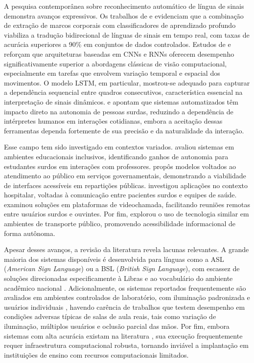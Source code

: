A pesquisa contemporânea sobre reconhecimento automático de língua de sinais demonstra avanços expressivos. Os trabalhos de \cite{attili:24} e \cite{jain:24} evidenciam que a combinação de extração de marcos corporais com classificadores de aprendizado profundo viabiliza a tradução bidirecional de línguas de sinais em tempo real, com taxas de acurácia superiores a 90\% em conjuntos de dados controlados. Estudos de \cite{abdulhussein:20} e \cite{li:22} reforçam que arquiteturas baseadas em CNNs e RNNs oferecem desempenho significativamente superior a abordagens clássicas de visão computacional, especialmente em tarefas que envolvem variação temporal e espacial dos movimentos. O modelo LSTM, em particular, mostrou-se adequado para capturar a dependência sequencial entre quadros consecutivos, característica essencial na interpretação de sinais dinâmicos. \cite{wang:24} e \cite{dockens:18} apontam que sistemas automatizados têm impacto direto na autonomia de pessoas surdas, reduzindo a dependência de intérpretes humanos em interações cotidianas, embora a aceitação dessas ferramentas dependa fortemente de sua precisão e da naturalidade da interação.

Esse campo tem sido investigado em contextos variados. \cite{attili:24} avaliou sistemas em ambientes educacionais inclusivos, identificando ganhos de autonomia para estudantes surdos em interações com professores. \cite{jain:24} propôs modelos voltados ao atendimento ao público em serviços governamentais, demonstrando a viabilidade de interfaces acessíveis em repartições públicas. \cite{abdulhussein:20} investigou aplicações no contexto hospitalar, voltadas à comunicação entre pacientes surdos e equipes de saúde. \cite{li:22} examinou soluções em plataformas de videochamada, facilitando reuniões remotas entre usuários surdos e ouvintes. Por fim, \cite{wang:24} explorou o uso de tecnologia similar em ambientes de transporte público, promovendo acessibilidade informacional de forma autônoma.

Apesar desses avanços, a revisão da literatura revela lacunas relevantes. A grande maioria dos sistemas disponíveis é desenvolvida para línguas como a ASL (\textit{American Sign Language}) ou a BSL (\textit{British Sign Language}), com escassez de soluções direcionadas especificamente à Libras e ao vocabulário do ambiente acadêmico nacional \cite{dockens:18}. Adicionalmente, os sistemas reportados frequentemente são avaliados em ambientes controlados de laboratório, com iluminação padronizada e usuários individuais \cite{attili:24, jain:24}, havendo carência de trabalhos que testem desempenho em condições adversas típicas de salas de aula reais, tais como variação de iluminação, múltiplos usuários e oclusão parcial das mãos. Por fim, embora sistemas com alta acurácia existam na literatura \cite{abdulhussein:20, li:22}, sua execução frequentemente requer infraestrutura computacional robusta, tornando inviável a implantação em instituições de ensino com recursos computacionais limitados.

